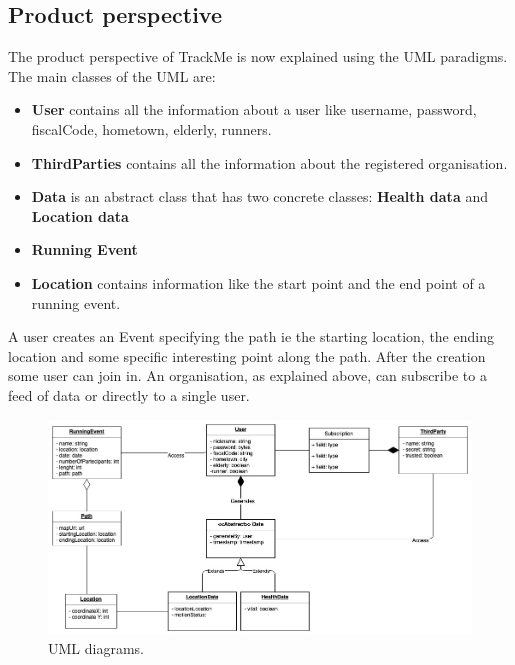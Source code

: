 \documentclass{article}
\begin{document}
\subsection{Product perspective}
The product perspective of TrackMe is now explained using the UML paradigms.
The main classes of the UML are:
\begin{itemize}
	\item \textbf{User} contains all the information about a user like username, password, fiscalCode, hometown, elderly, runners.
	\item \textbf{ThirdParties} contains all the information about the registered organisation.
	\item \textbf{Data} is an abstract class that has two concrete classes: 
		\textbf{Health data} and	 \textbf{Location data}
	\item \textbf{Running Event} 
	\item \textbf{Location} contains information like the start point and the end point of a running event.
\end{itemize}

A user creates an Event specifying the path ie the starting location, the ending location and some specific interesting point along the path.
After the creation some user can join in.
An organisation, as explained above, can subscribe to a feed of data or directly to a single user.


\begin{figure}[h!]
  \includegraphics[width=\textwidth]{Figures/ClassDiagram.jpg}
  \caption{UML diagrams.}
  \label{fig:umlDiagrams}
\end{figure}

\newpage
\end{document}

